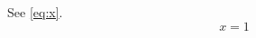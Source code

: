 \documentclass{article}
\begin{document}
See \ref{eq:x}.
\begin{equation}\label{eq:x}\nonumber x=1\end{equation}
\end{document}
